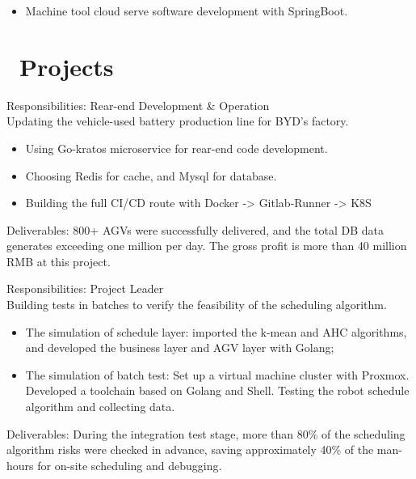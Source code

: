 \documentclass[a4paper,10pt]{resume}
\begin{document}
\begin{itemize}[parsep=0.5ex]
  \item Machine tool cloud serve software development with SpringBoot.
\end{itemize}

\section{\faFile\ Projects}
Responsibilities: Rear-end Development \& Operation
\\Updating the vehicle-used battery production line for BYD's factory.
\begin{itemize}[parsep=0.5ex]
  \item Using Go-kratos microservice for rear-end code development.
  \item Choosing Redis for cache, and Mysql for database.
  \item Building the full CI/CD route with Docker -> Gitlab-Runner -> K8S
\end{itemize}
Deliverables: 800+ AGVs were successfully delivered, and the total DB data generates exceeding one million per day. The gross profit is more than 40 million RMB at this project.


Responsibilities: Project Leader
\\Building tests in batches to verify the feasibility of the scheduling algorithm.
\begin{itemize}[parsep=0.5ex]
  \item The simulation of schedule layer: imported the k-mean and AHC algorithms, and developed the business layer and AGV layer with Golang;
  \item The simulation of batch test: Set up a virtual machine cluster with Proxmox. Developed a toolchain based on Golang and Shell. Testing the robot schedule algorithm and collecting data.
\end{itemize}
Deliverables: During the integration test stage, more than 80\% of the scheduling algorithm risks were checked in advance, saving approximately 40\% of the man-hours for on-site scheduling and debugging.
\end{document}
